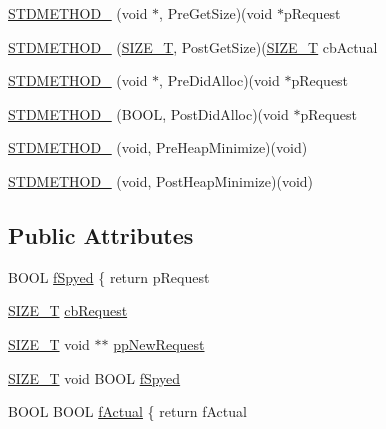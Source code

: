\begin{DoxyCompactItemize}
\item 
\hyperlink{class_c_malloc_spy_a180b0aa46aa802de74d7d309b98b6322}{S\-T\-D\-M\-E\-T\-H\-O\-D\-\_\-} (void $\ast$, Pre\-Get\-Size)(void $\ast$p\-Request
\item 
\hyperlink{class_c_malloc_spy_adc98b23d0543cb2540c5cc06440c7e40}{S\-T\-D\-M\-E\-T\-H\-O\-D\-\_\-} (\hyperlink{_stack_walker_8h_abf8e46e57d5b85295601cefa33de3b7a}{S\-I\-Z\-E\-\_\-\-T}, Post\-Get\-Size)(\hyperlink{_stack_walker_8h_abf8e46e57d5b85295601cefa33de3b7a}{S\-I\-Z\-E\-\_\-\-T} cb\-Actual
\item 
\hyperlink{class_c_malloc_spy_af06b8a20751c46b8a01dc99d324d0bd1}{S\-T\-D\-M\-E\-T\-H\-O\-D\-\_\-} (void $\ast$, Pre\-Did\-Alloc)(void $\ast$p\-Request
\item 
\hyperlink{class_c_malloc_spy_a149a9c6fe488df3f705430e1793ab3c3}{S\-T\-D\-M\-E\-T\-H\-O\-D\-\_\-} (B\-O\-O\-L, Post\-Did\-Alloc)(void $\ast$p\-Request
\item 
\hyperlink{class_c_malloc_spy_a6d3a8a7bd0d71dee8c4aea63082d26e2}{S\-T\-D\-M\-E\-T\-H\-O\-D\-\_\-} (void, Pre\-Heap\-Minimize)(void)
\item 
\hyperlink{class_c_malloc_spy_a24896f07ad8fd135e0c5c7ba0bd05f20}{S\-T\-D\-M\-E\-T\-H\-O\-D\-\_\-} (void, Post\-Heap\-Minimize)(void)
\end{DoxyCompactItemize}
\subsection*{Public Attributes}
\begin{DoxyCompactItemize}
\item 
B\-O\-O\-L \hyperlink{class_c_malloc_spy_a6409ca9d853418aaa52df69f44e131d9}{f\-Spyed} \{ return p\-Request
\item 
\hyperlink{_stack_walker_8h_abf8e46e57d5b85295601cefa33de3b7a}{S\-I\-Z\-E\-\_\-\-T} \hyperlink{class_c_malloc_spy_aaf02555ced89a6f90d0f2ea89408d5bd}{cb\-Request}
\item 
\hyperlink{_stack_walker_8h_abf8e46e57d5b85295601cefa33de3b7a}{S\-I\-Z\-E\-\_\-\-T} void $\ast$$\ast$ \hyperlink{class_c_malloc_spy_aebcfbe79078873befd70b2dac6027482}{pp\-New\-Request}
\item 
\hyperlink{_stack_walker_8h_abf8e46e57d5b85295601cefa33de3b7a}{S\-I\-Z\-E\-\_\-\-T} void B\-O\-O\-L \hyperlink{class_c_malloc_spy_ab3f126113ce51d6d88c896f937f12210}{f\-Spyed}
\item 
B\-O\-O\-L B\-O\-O\-L \hyperlink{class_c_malloc_spy_a181d2eec704cfcaab9523ff56f6dde09}{f\-Actual} \{ return f\-Actual
\end{DoxyCompactItemize}
